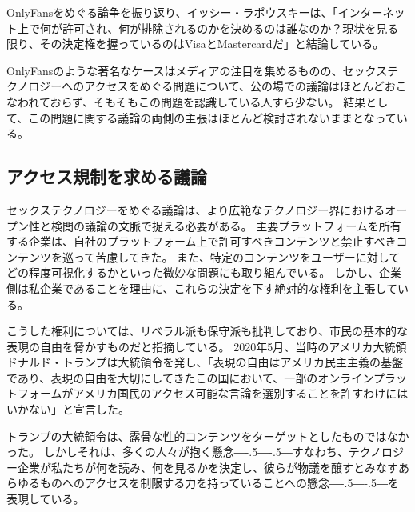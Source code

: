 \documentclass[paper=a4,book,openany]{jlreq}
\newcommand{\ig}[1]{}           %
\def\DDASH{―\kern-.5\zw―\kern-.5\zw―} %
\begin{document}
OnlyFansをめぐる論争を振り返り、イッシー・ラポウスキー\ig{Issue Lapowsky}は、「インターネット上で何が許可され、何が排除されるのかを決めるのは誰なのか？現状を見る限り、その決定権を握っているのはVisaとMastercardだ」と結論している\citep{lapowsky21:_onlyf_shows_visa_master_are}。

OnlyFansのような著名なケースはメディアの注目を集めるものの、セックステクノロジーへのアクセスをめぐる問題について、公の場での議論はほとんどおこなわれておらず、そもそもこの問題を認識している人すら少ない。
結果として、この問題に関する議論の両側の主張はほとんど検討されないままとなっている。

\subsection{アクセス規制を求める議論}

セックステクノロジーをめぐる議論は、より広範なテクノロジー界におけるオープン性と検閲の議論の文脈で捉える必要がある。
主要プラットフォームを所有する企業は、自社のプラットフォーム上で許可すべきコンテンツと禁止すべきコンテンツを巡って苦慮してきた。
また、特定のコンテンツをユーザーに対してどの程度可視化するかといった微妙な問題にも取り組んでいる\citep{economist20:_social_medias_strug_self}。
しかし、企業側は私企業であることを理由に、これらの決定を下す絶対的な権利を主張している。

こうした権利については、リベラル派も保守派も批判しており、市民の基本的な表現の自由を脅かすものだと指摘している。
2020年5月、当時のアメリカ大統領ドナルド・トランプは大統領令を発し、「表現の自由はアメリカ民主主義の基盤であり、表現の自由を大切にしてきたこの国において、一部のオンラインプラットフォームがアメリカ国民のアクセス可能な言論を選別することを許すわけにはいかない」と宣言した\citep{house20:_execut_order_preven_onlin_censor,lakier21:_great_free_speec_rever}。

トランプの大統領令は、露骨な性的コンテンツをターゲットとしたものではなかった。
しかしそれは、多くの人々が抱く懸念{\DDASH}すなわち、テクノロジー企業が私たちが何を読み、何を見るかを決定し、彼らが物議を醸すとみなすあらゆるものへのアクセスを制限する力を持っていることへの懸念{\DDASH}を表現している。
\end{document}
